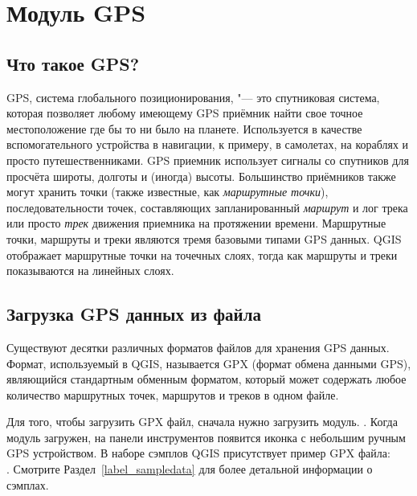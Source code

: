 
\section{Модуль GPS}\label{label_plugingps}


\subsection{Что такое GPS?}\label{whatsgps}

GPS, система глобального позиционирования, "--- это спутниковая система,
которая позволяет любому имеющему GPS приёмник найти свое точное
местоположение где бы то ни было на планете. Используется в качестве
вспомогательного устройства в навигации, к примеру, в самолетах, на
кораблях и просто путешественниками. GPS приемник использует сигналы со
спутников для просчёта широты, долготы и (иногда) высоты. Большинство
приёмников также могут хранить точки (также известные, как
\emph{маршрутные точки}), последовательности точек, составляющих
запланированный \emph{маршрут} и лог трека или просто \emph{трек}
движения приемника на протяжении времени. Маршрутные точки, маршруты и
треки являются тремя базовыми типами GPS данных. QGIS отображает
маршрутные точки на точечных слоях, тогда как маршруты и треки
показываются на линейных слоях.

\subsection{Загрузка GPS данных из файла}\label{label_loadgps}

Существуют десятки различных форматов файлов для хранения GPS данных.
Формат, используемый в QGIS, называется GPX (формат обмена данными GPS),
являющийся стандартным обменным форматом, который может содержать любое
количество маршрутных точек, маршрутов и треков в одном файле.

Для того, чтобы загрузить GPX файл, сначала нужно загрузить модуль.
 \arrow
{} \arrow
{}.
Когда модуль загружен, на панели инструментов появится иконка с
небольшим ручным GPS устройством. В наборе сэмплов QGIS присутствует
пример GPX файла: \\
.
Смотрите Раздел~\ref{label_sampledata} для более детальной информации
о сэмплах.

